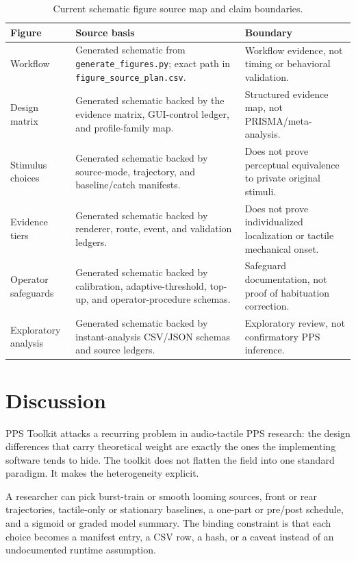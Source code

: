 \documentclass[pdflatex,sn-apa]{sn-jnl}
\newcommand{\toolkit}{PPS Toolkit}
\newcommand{\code}[1]{\texttt{#1}}
\begin{document}
\begin{table}[!htbp]
\caption{Current schematic figure source map and claim boundaries.}
\label{tab:figure-plan}
\footnotesize
\setlength{\tabcolsep}{3pt}
\begin{tabularx}{\textwidth}{>{\raggedright\arraybackslash}p{} >{\raggedright\arraybackslash}p{} >{\raggedright\arraybackslash}X}
\toprule
Figure & Source basis & Boundary \\
\midrule
Workflow & Generated schematic from \code{generate\_figures.py}; exact path in \code{figure\_source\_plan.csv}. & Workflow evidence, not timing or behavioral validation. \\
Design matrix & Generated schematic backed by the evidence matrix, GUI-control ledger, and profile-family map. & Structured evidence map, not PRISMA/meta-analysis. \\
Stimulus choices & Generated schematic backed by source-mode, trajectory, and baseline/catch manifests. & Does not prove perceptual equivalence to private original stimuli. \\
Evidence tiers & Generated schematic backed by renderer, route, event, and validation ledgers. & Does not prove individualized localization or tactile mechanical onset. \\
Operator safeguards & Generated schematic backed by calibration, adaptive-threshold, top-up, and operator-procedure schemas. & Safeguard documentation, not proof of habituation correction. \\
Exploratory analysis & Generated schematic backed by instant-analysis CSV/JSON schemas and source ledgers. & Exploratory review, not confirmatory PPS inference. \\
\bottomrule
\end{tabularx}
\end{table}

\section{Discussion}

\toolkit{} attacks a recurring problem in audio-tactile PPS research: the design differences that carry theoretical weight are exactly the ones the implementing software tends to hide. The toolkit does not flatten the field into one standard paradigm. It makes the heterogeneity explicit.

A researcher can pick burst-train or smooth looming sources, front or rear trajectories, tactile-only or stationary baselines, a one-part or pre/post schedule, and a sigmoid or graded model summary. The binding constraint is that each choice becomes a manifest entry, a CSV row, a hash, or a caveat instead of an undocumented runtime assumption.
\end{document}
